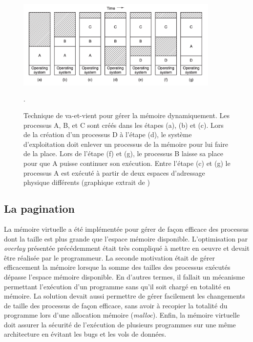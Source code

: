 \begin{figure}     \center     \includegraphics[width=10cm]{images/memory_swapping.png}     \caption{\label{pic:memory_swapping} Technique de va-et-vient pour gérer la mémoire dynamiquement. Les processus A, B, et C sont créés dans les étapes (a), (b) et (c). Lors de la création d'un processus D à l'étape (d), le système d'exploitation doit enlever un processus de la mémoire pour lui faire de la place. Lors de l'étape (f) et (g), le processus B laisse sa place pour que A puisse continuer son exécution. Entre l'étape (c) et (g) le processus A est exécuté à partir de deux espaces d'adressage physique différents (graphique extrait de \cite{tanenbaum2008systeme})}.
\end{figure}




\subsection{La pagination} \label{sec:page}

La mémoire virtuelle a été implémentée pour gérer de façon efficace des processus dont la taille est plus grande que l'espace mémoire disponible. L'optimisation par \textit{overlay} présentée précédemment était très compliqué à mettre en oeuvre et devait être réalisée par le programmeur. La seconde motivation était de gérer efficacement la mémoire lorsque la somme des tailles des processus exécutés dépasse l'espace mémoire disponible. En d'autres termes, il fallait un mécanisme permettant l'exécution d'un programme sans qu'il soit chargé en totalité en mémoire. La solution devait aussi permettre de gérer facilement les changements de taille des processus de façon efficace, sans avoir à recopier la totalité du programme lors d'une allocation mémoire (\textit{malloc}). Enfin, la mémoire virtuelle doit assurer la sécurité de l'exécution de plusieurs programmes sur une même architecture en évitant les bugs et les vols de données.



